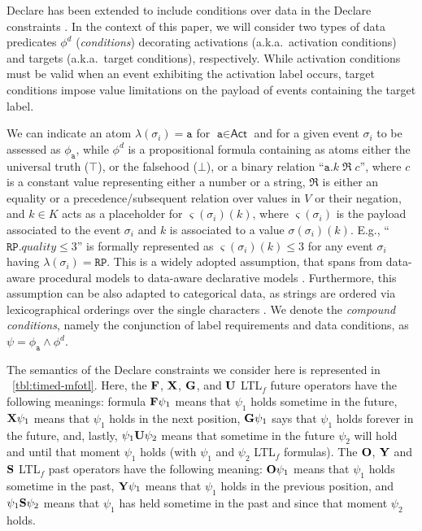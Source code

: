 Declare has been extended to include conditions over data in the Declare constraints \cite{}. In the context of this paper, we will consider two types of data predicates $\phi^d$ (\textit{conditions}) decorating activations (a.k.a.\ activation conditions) and targets (a.k.a.\ target conditions), respectively.
While activation conditions must be valid when an event exhibiting the activation label occurs, target conditions impose value limitations on the payload of events containing the target label.


We can indicate an atom $\lambda(\sigma_i)=\texttt{a}$ for $\texttt{a}\in\textsf{Act}$ and for a given event $\sigma_i$ to be assessed as $\phi_\texttt{a}$, while $\phi^d$ is a propositional formula containing as atoms either the universal truth ($\top$), or the falsehood ($\bot$), or a binary relation ``$\texttt{a}.k\;\Re\;c$'', where $c$ is a constant value representing either a number or a string, $\Re$ is either an equality or a precedence/subsequent relation over values in $V$ or their negation, and $k\in K$ acts as a placeholder for $\varsigma(\sigma_i)(k)$, where $\varsigma(\sigma_i)$ is the payload associated to the event $\sigma_i$ and $k$ is associated to a value $\sigma(\sigma_i)(k)$. E.g., ``$\texttt{RP}.\textit{quality}\leq 3$'' is formally represented as $\varsigma(\sigma_i)(k)\leq 3$ for any event $\sigma_i$ having $\lambda(\sigma_i)=\texttt{RP}$.  This is a widely adopted assumption, that spans from data-aware procedural models \cite{MultiPerspective} to data-aware declarative models \cite{10.1007/978-3-642-40176-3_8}. Furthermore, this assumption can be also adapted to categorical data, as strings are ordered via lexicographical orderings over the single characters \cite{MultiPerspective}. We denote the \textit{compound conditions}, namely the conjunction of label requirements and data conditions, as $\psi=\phi_{\texttt{a}}\wedge \phi^d$.



The semantics of the Declare constraints we consider here is represented in \tablename~\ref{tbl:timed-mfotl}.
Here, the $\mathbf{F}$, $\mathbf{X}$, $\mathbf{G}$, and $\mathbf{U}$ LTL$_f$ future operators have the following meanings: formula $\mathbf{F} \psi_1$ means that $\psi_1$ holds sometime in the future, $\mathbf{X} \psi_1$ means that $\psi_1$
holds in the next position, $\mathbf{G} \psi_1$ says that $\psi_1$ holds forever in the future, and, lastly, $\psi_1 \mathbf{U} \psi_2$ means that sometime in the future $\psi_2$ will hold and
until that moment $\psi_1$ holds (with $\psi_1$ and $\psi_2$ LTL$_f$ formulas).
The $\mathbf{O}$, $\mathbf{Y}$ and $\mathbf{S}$ LTL$_f$ past operators have the following meaning:
$\mathbf{O} \psi_1$ means that $\psi_1$ holds sometime in the past,
$\mathbf{Y} \psi_1$ means that $\psi_1$ holds in the previous position,
and $\psi_1 \mathbf{S} \psi_2$ means that $\psi_1$ has held sometime in the past and since that moment $\psi_2$ holds.

